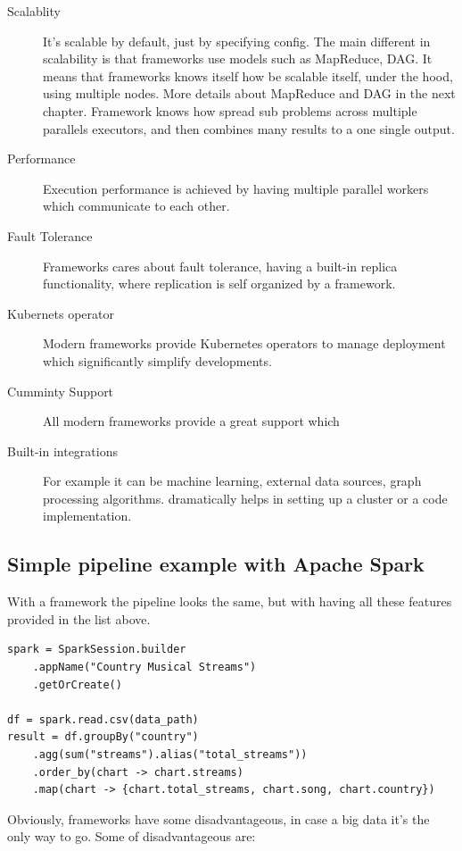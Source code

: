 \begin{description}
    \item[Scalablity] It's scalable by default, just by specifying config.
    The main different in scalability is that frameworks use models such as
    MapReduce, DAG.
    It means that frameworks knows itself how be scalable itself, under the hood,
    using multiple nodes.
    More details about MapReduce and DAG in the next chapter.
    Framework knows how spread sub problems across multiple parallels executors,
    and then combines many results to a one single output.
    \item[Performance] Execution performance is achieved by having multiple
    parallel workers which communicate to each other.
    \item[Fault Tolerance] Frameworks cares about fault tolerance, having a built-in replica
    functionality, where replication is self organized by a framework.
    \item[Kubernets operator] Modern frameworks provide Kubernetes operators to
    manage deployment which significantly simplify developments.
    \item[Cumminty Support] All modern frameworks provide a great support which
    \item [Built-in integrations] For example it can be machine learning, external data sources,
    graph processing algorithms.
    dramatically helps in setting up a cluster or a code implementation.
\end{description}

\subsection{Simple pipeline example with Apache Spark}\label{subsec:simple-spark}

With a framework the pipeline looks the same, but with having all these features
provided in the list above.

\begin{lstlisting}[label={lst:spark}]
spark = SparkSession.builder
    .appName("Country Musical Streams")
    .getOrCreate()

df = spark.read.csv(data_path)
result = df.groupBy("country")
    .agg(sum("streams").alias("total_streams"))
    .order_by(chart -> chart.streams)
    .map(chart -> {chart.total_streams, chart.song, chart.country})

\end{lstlisting}

Obviously, frameworks have some disadvantageous, in case a big data
it's the only way to go.
Some of disadvantageous are:

